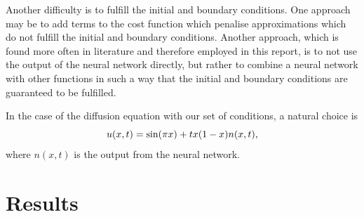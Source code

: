 \documentclass[11pt,british,a4paper]{article}
\numberwithin{equation}{section}
\begin{document}
Another difficulty is to fulfill the initial and boundary conditions. One approach may be to add terms to the cost function which penalise approximations which do not fulfill the initial and boundary conditions. Another approach, which is found more often in literature\cite{nnde} and therefore employed in this report, is to not use the output of the neural network directly, but rather to combine a neural network with other functions in such a way that the initial and boundary conditions are guaranteed to be fulfilled.

In the case of the diffusion equation with our set of conditions, a natural choice is
\begin{equation}
    u(x,t) = \sin(\pi x) + tx\qty(1-x)n(x,t),
\end{equation}
where \(n(x,t)\) is the output from the neural network.

\section{Results}
\end{document}
